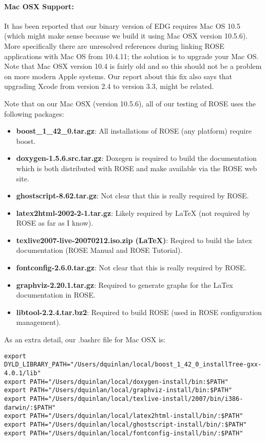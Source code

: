 \paragraph{Mac OSX Support:}
   It has been reported that our binary version of EDG requires Mac OS 10.5
(which might make sense because we build it using Mac OSX version 10.5.6).  More
specifically there are unresolved references during linking ROSE applications with
Mac OS from 10.4.11; the solution is to upgrade your Mac OS.  Note that Mac OSX 
version 10.4 is fairly old and so this should not be a problem on more modern Apple
systems.  Our report about this fix also says that upgrading Xcode from version 2.4 
to version 3.3, might be related.

Note that on our Mac OSX (version 10.5.6), all of our testing of ROSE uses the following packages:
\begin{itemize}
   \item {\bf boost\_1\_42\_0.tar.gz}:
     All installations of ROSE (any platform) require boost.

   \item {\bf doxygen-1.5.6.src.tar.gz}:
     Doxegen is required to build the documentation which is both distributed with ROSE
     and make available via the ROSE web site.

   \item {\bf ghostscript-8.62.tar.gz}:
     Not clear that this is really required by ROSE.

   \item {\bf latex2html-2002-2-1.tar.gz}:
     Likely required by LaTeX (not required by ROSE as far as I know).

   \item {\bf texlive2007-live-20070212.iso.zip (LaTeX)}:
     Reqired to build the latex documentation (ROSE Manual and ROSE Tutorial).

   \item {\bf fontconfig-2.6.0.tar.gz}:
     Not clear that this is really required by ROSE.

   \item {\bf graphviz-2.20.1.tar.gz}:
     Required to generate graphs for the LaTex documentation in ROSE.

   \item {\bf libtool-2.2.4.tar.bz2}:
     Required to build ROSE (used in ROSE configuration management).
\end{itemize}

As an extra detail, our .bashrc file for Mac OSX is:
\begin{verbatim}
export DYLD_LIBRARY_PATH="/Users/dquinlan/local/boost_1_42_0_installTree-gxx-4.0.1/lib"
export PATH="/Users/dquinlan/local/doxygen-install/bin:$PATH"
export PATH="/Users/dquinlan/local/graphviz-install/bin:$PATH"
export PATH="/Users/dquinlan/local/texlive-install/2007/bin/i386-darwin/:$PATH"
export PATH="/Users/dquinlan/local/latex2html-install/bin/:$PATH"
export PATH="/Users/dquinlan/local/ghostscript-install/bin/:$PATH"
export PATH="/Users/dquinlan/local/fontconfig-install/bin/:$PATH"
\end{verbatim}

